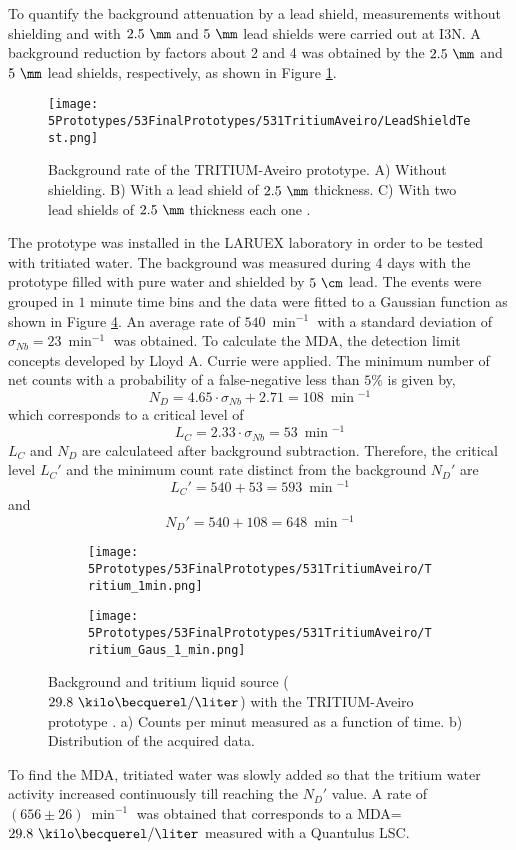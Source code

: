 To quantify the background attenuation by a lead shield, measurements without shielding and with $2.5~\mm$ and $5~\mm$ lead shields were carried out at I3N. A background reduction by factors about 2 and 4 was obtained by the $2.5~\mm$ and $5~\mm$ lead shields, respectively, as shown in Figure \ref{fig:LeadShieldTest}.
\begin{figure}[h]
\centering
\texttt{[image: 5Prototypes/53FinalPrototypes/531TritiumAveiro/LeadShieldTest.png]}
\caption{Background rate of the TRITIUM-Aveiro prototype. A) Without shielding. B) With a lead shield of $2.5~\mm$ thickness. C) With two lead shields of $2.5~\mm$ thickness each one \cite{ExperimentalPaperCarlos}.\label{fig:LeadShieldTest}}
\end{figure}

The prototype was installed in the LARUEX laboratory in order to be tested with tritiated water. The background was measured during 4 days with the prototype filled with pure water and shielded by $5~\cm$ lead. The events were grouped in $1$ minute time bins and the data were fitted to a Gaussian function as shown in Figure \ref{fig:BackgroundTritium1min}. An average rate of $540~\min^{-1}$ with a standard deviation of $\sigma_{Nb}=23~\min^{-1}$ was obtained. To calculate the MDA, the detection limit concepts developed by Lloyd A. Currie \cite{CurieLimit} were applied. The minimum number of net counts with a probability of a false-negative less than $5\%$ is given by,
\begin{equation}
N_D = 4.65 \cdot{}\sigma_{Nb} + 2.71 = 108~\min{}^{-1}
\label{eq:EquationNetCounts}
\end{equation}
which corresponds to a critical level of 
$$L_C = 2.33\cdot{}\sigma_{Nb}=53 ~\min{}^{-1}$$
$L_C$ and $N_D$ are calculateed after background subtraction. Therefore, the critical level $L_C'$ and the minimum count rate distinct from the background $N_D'$ are $$L_C'=540+53 = 593~\min{}^{-1}$$ and $$N_D'= 540+108=648~\min{}^{-1}$$
\begin{figure}
\centering
    \begin{subfigure}[b]{0.45\textwidth}
    \centering
    \texttt{[image: 5Prototypes/53FinalPrototypes/531TritiumAveiro/Tritium\_1min.png]}  
    \caption{\label{subfig:MeasurementInRealTime}}
    \end{subfigure}
    \hfill
    \begin{subfigure}[b]{0.45\textwidth}
    \centering
    \texttt{[image: 5Prototypes/53FinalPrototypes/531TritiumAveiro/Tritium\_Gaus\_1\_min.png]}  
    \caption{\label{subfig:DistributionofMeasurement}}
    \end{subfigure}
 \caption{Background and tritium liquid source ($29.8~\kilo\becquerel/\liter$) with the TRITIUM-Aveiro prototype \cite{ExperimentalPaperCarlos}. a) Counts per minut measured as a function of time. b) Distribution of the acquired data.}
 \label{fig:BackgroundTritium1min}
\end{figure}
To find the MDA, tritiated water was slowly added  so that the tritium water activity increased continuously till reaching the $N_D'$ value. A rate of $(656 \pm 26)~\min^{-1}$ was obtained that corresponds to a MDA=$29.8~\kilo\becquerel/\liter$ measured with a Quantulus LSC.

